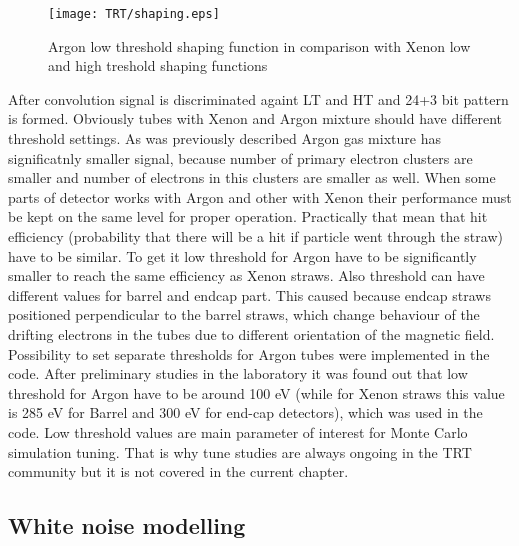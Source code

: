 \begin{figure}
\begin{center}
 \texttt{[image: TRT/shaping.eps]}
\caption{Argon low threshold shaping function in comparison with Xenon low and high treshold shaping functions}
\label{fig:shaping}
\end{center}
\end{figure}


After convolution signal is discriminated againt LT and HT and 24+3 bit pattern is formed.
Obviously tubes with Xenon and Argon mixture should have different threshold settings.
As was previously described Argon gas mixture has significatnly smaller signal, because
number of primary electron clusters are smaller and number of electrons in this clusters are smaller as well.
When some parts of detector works with Argon and other with Xenon their performance must be kept on the same level for
proper operation. Practically that mean that hit efficiency (probability that there will be a hit if particle went through the straw) have to be 
similar. To get it low threshold for Argon have to be significantly smaller to reach the same efficiency as Xenon straws.
Also threshold can have different values for barrel and endcap part. This caused because endcap straws positioned perpendicular to the barrel straws, 
which change behaviour of the drifting electrons in the tubes due to different orientation of the magnetic field.
Possibility to set separate thresholds for Argon tubes were implemented in the code.
After preliminary studies in the laboratory it was found out that low threshold for Argon have to be around 100 eV 
(while for Xenon straws this value is 285 eV for Barrel and 300 eV for end-cap detectors), which was used in the code.
Low threshold values are main parameter of interest for Monte Carlo simulation tuning. That is why tune studies are always ongoing 
in the TRT community but it is not covered in the current chapter.

\subsection{White noise modelling}


